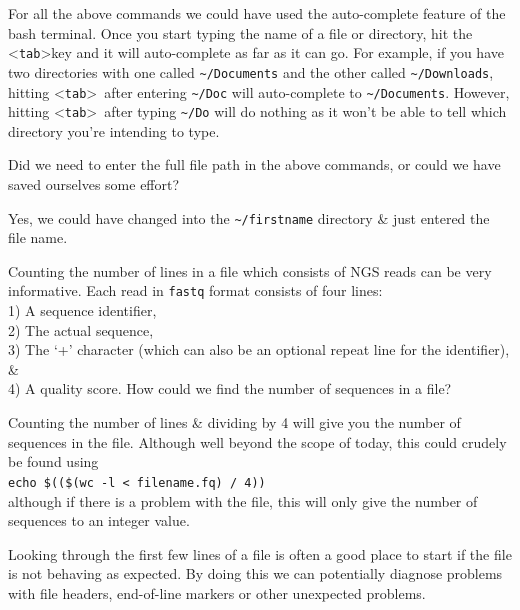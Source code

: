 \documentclass[a4paper,12pt,twoside]{memoir}
\begin{document}
\begin{note}
For all the above commands we could have used the auto-complete
feature of the bash terminal.
Once you start typing the name of a file or directory, hit the
\textless \texttt{tab}\textgreater key and it will auto-complete as far as it can go.
For example, if you have two directories with one called
\texttt{\~{}/Documents} and the other called \texttt{\~{}/Downloads},
hitting \textless \texttt{tab}\textgreater ~after entering \texttt{\~{}/Doc} will auto-complete to \texttt{\~{}/Documents}. 
However, hitting \textless \texttt{tab}\textgreater ~after typing \texttt{\~{}/Do} will
do nothing as it won't be able to tell which directory you're
intending to type.\\
\end{note}

\begin{questions}
Did we need to enter the full file path in the above commands, or
could we have saved ourselves some effort? \\

\begin{answer}
Yes, we could have changed into the \texttt{\~{}/firstname} directory \&
just entered the file name. \\
\end{answer}

Counting the number of lines in a file which consists of NGS reads can be very informative.
Each read in \texttt{fastq} format consists of four lines: \\
1) A sequence identifier, \\
2) The actual sequence, \\
3) The `+' character (which can also be an optional repeat line for the identifier), \& \\
4) A quality score.
How could we find the number of sequences in a file? \\
\begin{answer}
Counting the number of lines \& dividing by 4 will give you the number of sequences in the file.
Although well beyond the scope of today, this could crudely be found using \\
\texttt{echo \$((\$(wc -l < filename.fq) / 4))}\\
although if there is a problem with the file, this will only give the number of sequences to an integer value.
\end{answer}
\end{questions}

\begin{note}
Looking through the first few lines of a file is often a good place to start if the file is not behaving as expected.
By doing this we can potentially diagnose problems with file headers, end-of-line markers or other unexpected problems. \\
\end{note}
\end{document}
